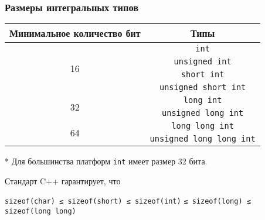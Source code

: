 \documentclass[compress, 8pt]{beamer}
\begin{document}
\begin{frame}[fragile]

    \frametitle{Размеры интегральных типов}


    \begin{table}[H]
        \begin{threeparttable}
            \begin{tabular}{|c|c|}
                \hline
                Минимальное количество бит & Типы \\
                \hline
                \hline
                \multirow{4}{4em}{16}
                & \verb|int|\tnote{*} \\
                & \verb|unsigned int| \\
                & \verb|short int| \\
                & \verb|unsigned short int| \\
                \hline
                \multirow{2}{4em}{32} & \verb|long int| \\
                & \verb|unsigned long int| \\
                \hline
                \multirow{2}{4em}{64} & \verb|long long int| \\
                & \verb|unsigned long long int| \\
                \hline
            \end{tabular}
            \begin{tablenotes}
            \small
            \item[*] Для большинства платформ
                \verb|int| имеет размер 32 бита.
            \end{tablenotes}
        \end{threeparttable}
    \end{table}

    \hfill \break
    Стандарт C++ гарантирует, что

    \begin{center}
        \verb|sizeof(char) ≤ sizeof(short) ≤ sizeof(int)|
        \verb|≤ sizeof(long) ≤ sizeof(long long)|
    \end{center}

\end{frame}
\end{document}
